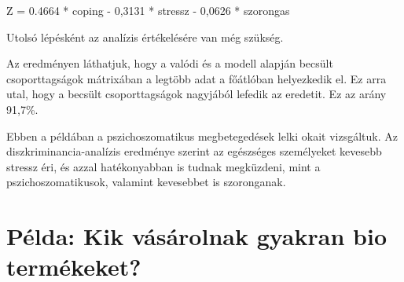 \documentclass[
  letterpaper,
]{krantz}
\makeatletter
\newenvironment{Shaded}{\begin{snugshade}}{\end{snugshade}}
\newcommand{\AttributeTok}[1]{\textcolor[rgb]{0.40,0.45,0.13}{#1}}
\newcommand{\CommentTok}[1]{\textcolor[rgb]{0.37,0.37,0.37}{#1}}
\newcommand{\DecValTok}[1]{\textcolor[rgb]{0.68,0.00,0.00}{#1}}
\newcommand{\FunctionTok}[1]{\textcolor[rgb]{0.28,0.35,0.67}{#1}}
\newcommand{\NormalTok}[1]{\textcolor[rgb]{0.00,0.23,0.31}{#1}}
\newcommand{\OtherTok}[1]{\textcolor[rgb]{0.00,0.23,0.31}{#1}}
\newcommand{\SpecialCharTok}[1]{\textcolor[rgb]{0.37,0.37,0.37}{#1}}
\newcommand{\StringTok}[1]{\textcolor[rgb]{0.13,0.47,0.30}{#1}}
\newenvironment{kframe}{%
\medskip{}
\setlength{\fboxsep}{.8em}
 \def\at@end@of@kframe{}%
 \ifinner\ifhmode%
  \def\at@end@of@kframe{\end{minipage}}%
  \begin{minipage}{\columnwidth}%
 \fi\fi%
 \def\FrameCommand##1{\hskip\@totalleftmargin \hskip-\fboxsep
 \colorbox{shadecolor}{##1}\hskip-\fboxsep
     \hskip-\linewidth \hskip-\@totalleftmargin \hskip\columnwidth}%
 \MakeFramed {\advance\hsize-\width
   \@totalleftmargin\z@ \linewidth\hsize
   \@setminipage}}%
 {\par\unskip\endMakeFramed%
 \at@end@of@kframe}
\renewenvironment{Shaded}{\begin{kframe}}{\end{kframe}}
\makeatother
\begin{document}
\begin{Shaded}
\begin{Highlighting}[]
\NormalTok{Z = 0.4664 * coping {-} 0,3131 * stressz {-} 0,0626 * szorongas}
\end{Highlighting}
\end{Shaded}

Utolsó lépésként az analízis értékelésére van még szükség.

\begin{Shaded}
\end{Shaded}

Az eredményen láthatjuk, hogy a valódi és a modell alapján becsült
csoporttagságok mátrixában a legtöbb adat a főátlóban helyezkedik el. Ez
arra utal, hogy a becsült csoporttagságok nagyjából lefedik az eredetit.
Ez az arány 91,7\%.

Ebben a példában a pszichoszomatikus megbetegedések lelki okait
vizsgáltuk. Az diszkriminancia-analízis eredménye szerint az egészséges
személyeket kevesebb stressz éri, és azzal hatékonyabban is tudnak
megküzdeni, mint a pszichoszomatikusok, valamint kevesebbet is
szoronganak.

\hypertarget{puxe9lda-kik-vuxe1suxe1rolnak-gyakran-bio-termuxe9keket}{%
\section{Példa: Kik vásárolnak gyakran bio
termékeket?}\label{puxe9lda-kik-vuxe1suxe1rolnak-gyakran-bio-termuxe9keket}}
\end{document}
